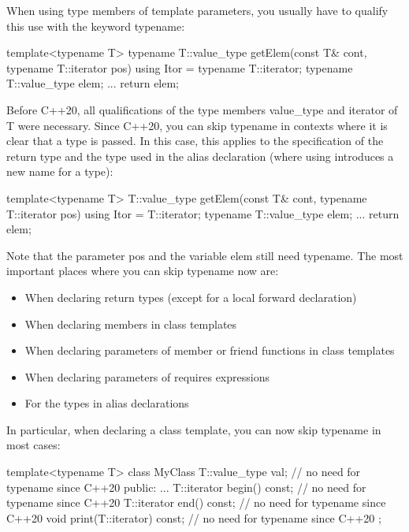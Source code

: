 
When using type members of template parameters, you usually have to qualify this use with the keyword typename:

\begin{cpp}
template<typename T>
typename T::value_type getElem(const T& cont, typename T::iterator pos)
{
	using Itor = typename T::iterator;
	typename T::value_type elem;
	...
	return elem;
}
\end{cpp}

Before C++20, all qualifications of the type members value\_type and iterator of T were necessary.
Since C++20, you can skip typename in contexts where it is clear that a type is passed. In this case, this applies to the specification of the return type and the type used in the alias declaration (where using introduces a new name for a type):

\begin{cpp}
template<typename T>
T::value_type getElem(const T& cont, typename T::iterator pos)
{
	using Itor = T::iterator;
	typename T::value_type elem;
	...
	return elem;
}
\end{cpp}

Note that the parameter pos and the variable elem still need typename. The most important places where you can skip typename now are:

\begin{itemize}
\item 
When declaring return types (except for a local forward declaration)

\item 
When declaring members in class templates

\item 
When declaring parameters of member or friend functions in class templates

\item 
When declaring parameters of requires expressions

\item 
For the types in alias declarations
\end{itemize}

In particular, when declaring a class template, you can now skip typename in most cases:

\begin{cpp}
template<typename T>
class MyClass {
	T::value_type val; // no need for typename since C++20
public:
	...
	T::iterator begin() const; // no need for typename since C++20
	T::iterator end() const; // no need for typename since C++20
	void print(T::iterator) const; // no need for typename since C++20
};
\end{cpp}

